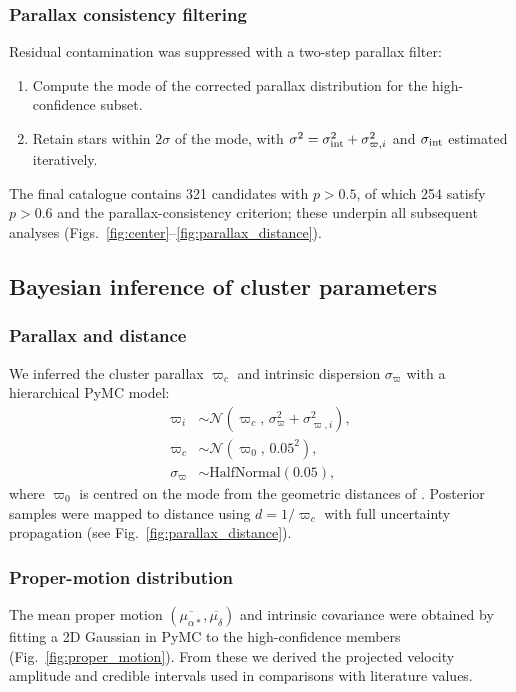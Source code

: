 \documentclass[../main.tex]{subfiles}
\begin{document}
\subsubsection{Parallax consistency filtering}
Residual contamination was suppressed with a two-step parallax filter:
\begin{enumerate}
  \item Compute the mode of the corrected parallax distribution for the high-confidence subset.
  \item Retain stars within $2\sigma$ of the mode, with $\sigma^2=\sigma_{\rm int}^2+\sigma_{\varpi,i}^2$ and $\sigma_{\rm int}$ estimated iteratively.
\end{enumerate}
The final catalogue contains 321 candidates with $p>0.5$, of which 254 satisfy $p>0.6$ and the parallax-consistency criterion; these underpin all subsequent analyses (Figs.~\ref{fig:center}–\ref{fig:parallax_distance}).

\subsection{Bayesian inference of cluster parameters}
\label{subsec:bayesian-inference}

\subsubsection{Parallax and distance}
We inferred the cluster parallax $\varpi_c$ and intrinsic dispersion $\sigma_\varpi$ with a hierarchical PyMC model:
\begin{align*}
  \varpi_i      &\sim \mathcal{N}(\varpi_c,\,\sigma_\varpi^2+\sigma_{\varpi,i}^2),\\
  \varpi_c      &\sim \mathcal{N}(\varpi_0,\,0.05^2),\\
  \sigma_\varpi &\sim \mathrm{HalfNormal}(0.05),
\end{align*}
where $\varpi_0$ is centred on the mode from the geometric distances of \citet{2021AJ....161..147B}. Posterior samples were mapped to distance using $d=1/\varpi_c$ with full uncertainty propagation (see Fig.~\ref{fig:parallax_distance}).

\subsubsection{Proper-motion distribution}
The mean proper motion $(\overline{\mu_{\alpha*}},\overline{\mu_\delta})$ and intrinsic covariance were obtained by fitting a 2D Gaussian in PyMC to the high-confidence members (Fig.~\ref{fig:proper_motion}). From these we derived the projected velocity amplitude and credible intervals used in comparisons with literature values.
\end{document}
